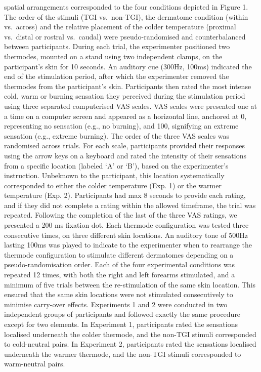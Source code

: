 \documentclass[
]{article}
\begin{document}
spatial arrangements corresponded to the four conditions depicted in
Figure 1. The order of the stimuli (TGI vs.~non-TGI), the dermatome
condition (within vs.~across) and the relative placement of the colder
temperature (proximal vs.~distal or rostral vs.~caudal) were
pseudo-randomised and counterbalanced between participants. During each
trial, the experimenter positioned two thermodes, mounted on a stand
using two independent clamps, on the participant's skin for 10 seconds.
An auditory cue (300Hz, 100ms) indicated the end of the stimulation
period, after which the experimenter removed the thermodes from the
participant's skin. Participants then rated the most intense cold, warm
or burning sensation they perceived during the stimulation period using
three separated computerised VAS scales. VAS scales were presented one
at a time on a computer screen and appeared as a horizontal line,
anchored at 0, representing no sensation (e.g., no burning), and 100,
signifying an extreme sensation (e.g., extreme burning). The order of
the three VAS scales was randomised across trials. For each scale,
participants provided their responses using the arrow keys on a keyboard
and rated the intensity of their sensations from a specific location
(labeled `A' or `B'), based on the experimenter's instruction. Unbeknown
to the participant, this location systematically corresponded to either
the colder temperature (Exp. 1) or the warmer temperature (Exp. 2).
Participants had max 8 seconds to provide each rating, and if they did
not complete a rating within the allowed timeframe, the trial was
repeated. Following the completion of the last of the three VAS ratings,
we presented a 200 ms fixation dot. Each thermode configuration was
tested three consecutive times, on three different skin locations. An
auditory tone of 500Hz lasting 100ms was played to indicate to the
experimenter when to rearrange the thermode configuration to stimulate
different dermatomes depending on a pseudo-randomisation order. Each of
the four experimental conditions was repeated 12 times, with both the
right and left forearms stimulated, and a minimum of five trials between
the re-stimulation of the same skin location. This ensured that the same
skin locations were not stimulated consecutively to minimise carry-over
effects. Experiments 1 and 2 were conducted in two independent groups of
participants and followed exactly the same procedure except for two
elements. In Experiment 1, participants rated the sensations localised
underneath the colder thermode, and the non-TGI stimuli corresponded to
cold-neutral pairs. In Experiment 2, participants rated the sensations
localised underneath the warmer thermode, and the non-TGI stimuli
corresponded to warm-neutral pairs.
\end{document}
